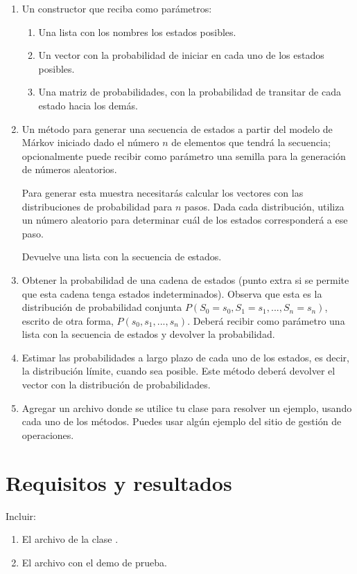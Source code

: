 \begin{enumerate}
 \item Un constructor que reciba como parámetros:
 \begin{enumerate}
  \item Una lista con los nombres los estados posibles.
  \item Un vector con la probabilidad de iniciar en cada uno de los estados posibles.
  \item Una matriz de probabilidades, con la probabilidad de transitar de cada estado hacia los demás.
 \end{enumerate}

 \item Un método para generar una secuencia de estados a partir del modelo de Márkov iniciado dado el número $n$ de elementos que tendrá la secuencia; opcionalmente puede recibir como parámetro una semilla para la generación de números aleatorios.
 
 Para generar esta muestra necesitarás calcular los vectores con las distribuciones de probabilidad para $n$ pasos.  Dada cada distribución, utiliza un número aleatorio para determinar cuál de los estados corresponderá a ese paso.
 
 Devuelve una lista con la secuencia de estados.
 
 \item Obtener la probabilidad de una cadena de estados (punto extra si se permite que esta cadena tenga estados indeterminados).  Observa que esta es la distribución de probabilidad conjunta $P(S_0=s_0,S_1=s_1,...,S_n=s_n)$, escrito de otra forma, $P(s_0,s_1,...,s_n)$.  Deberá recibir como parámetro una lista con la secuencia de estados y devolver la probabilidad.
 
 \item Estimar las probabilidades a largo plazo de cada uno de los estados, es decir, la distribución límite, cuando sea posible.  Este método deberá devolver el vector con la distribución de probabilidades.
 
 \item Agregar un archivo donde se utilice tu clase para resolver un ejemplo, usando cada uno de los métodos.  Puedes usar algún ejemplo del sitio de gestión de operaciones.
\end{enumerate}


\section{Requisitos y resultados}

Incluir:

\begin{enumerate}
 \item El archivo de la clase .
 \item El archivo con el demo de prueba.
\end{enumerate}

